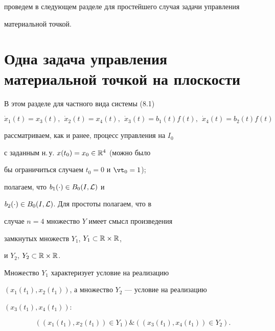 проведем в следующем разделе для простейшего случая задачи управления


материальной точкой.





\section{Одна задача управления материальной точкой на плоскости}





В этом разделе для частного вида системы (8.1)


\begin{equation}


{{\Dot x}_1}(t) = {x_3}(t),\ \ {{\Dot x}_2}(t) =


{x_4}(t),\ \ {{\Dot x}_3}(t) = {{b_1}(t)}{f(t)},\ \


{{\Dot x}_4}(t) = {{b_2}(t)}{f(t)}


\end{equation}


рассматриваем, как и ранее, процесс управления на $I_0$


с заданным н.\,у. ${x(t_0)} = {x_0} \in {{\Bbb R}^4}$ (можно было


бы ограничиться случаем ${t_0} = 0$ и ${{\vt}_0} = 1$);


полагаем, что ${b_1}(\cdot) \in {B_0}(I,{\cal L})$ и


${b_2}(\cdot) \in {B_0}(I,{\cal L})$. Для простоты полагаем, что в


случае $n = 4$ множество $Y$ имеет смысл произведения


замкнутых множеств ${Y_1}$, ${Y_1} \subset {\Bbb R} \times {\Bbb R}$,


и ${Y_2}$, ${Y_2} \subset {\Bbb R} \times {\Bbb R}$.


Множество $Y_1$ характеризует условие на реализацию


$({{x_1}(t_1)},{{x_2}(t_1)})$, а множество $Y_2$ --- условие на реализацию


$({{x_3}(t_1)},{{x_4}(t_1)})$:


\begin{equation}


(({{x_1}(t_1)},{{x_2}(t_1)}) \in {Y_1}) \& (({{x_3}(t_1)},{{x_4}(t_1)}) \in


{Y_2}).


\end{equation}





